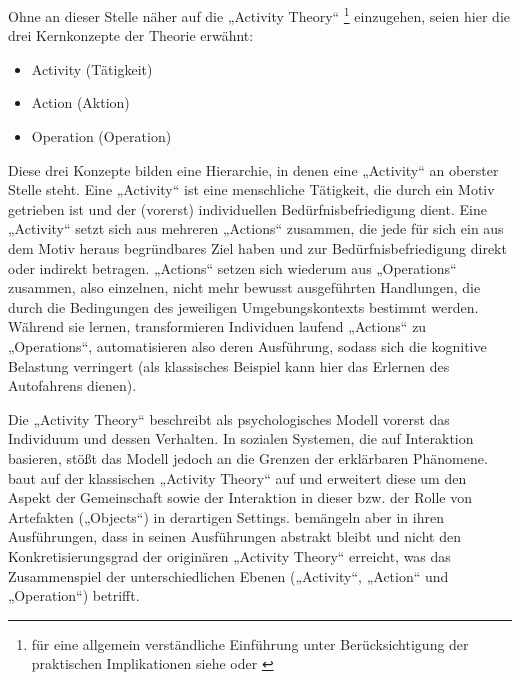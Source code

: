 Ohne an dieser Stelle näher auf die „Activity Theory“ \footnote{für eine allgemein verständliche Einführung unter Berücksichtigung der praktischen Implikationen siehe \citet{Dahme97} oder \citet{Nardi06}} einzugehen, seien hier die drei Kernkonzepte der Theorie erwähnt:
\begin{itemize}
	\item Activity (Tätigkeit)
	\item Action (Aktion)
	\item Operation (Operation)
\end{itemize}

Diese drei Konzepte bilden eine Hierarchie, in denen eine „Activity“ an oberster Stelle steht. Eine „Activity“ ist eine menschliche Tätigkeit, die durch ein Motiv getrieben ist und der (vorerst) individuellen Bedürfnisbefriedigung dient. Eine „Activity“ setzt sich aus mehreren „Actions“ zusammen, die jede für sich ein aus dem Motiv heraus begründbares Ziel haben und zur Bedürfnisbefriedigung direkt oder indirekt betragen. „Actions“ setzen sich wiederum aus „Operations“ zusammen, also einzelnen, nicht mehr bewusst ausgeführten Handlungen, die durch die Bedingungen des jeweiligen Umgebungskontexts bestimmt werden. Während sie lernen, transformieren Individuen laufend „Actions“ zu „Operations“, automatisieren also deren Ausführung, sodass sich die kognitive Belastung verringert (als klassisches Beispiel kann hier das Erlernen des Autofahrens dienen).

Die „Activity Theory“ beschreibt als psychologisches Modell vorerst das Individuum und dessen Verhalten. In sozialen Systemen, die auf Interaktion basieren, stößt das Modell jedoch an die Grenzen der erklärbaren Phänomene. \citet{Engestrom87} baut auf der klassischen „Activity Theory“ auf und erweitert diese um den Aspekt der Gemeinschaft sowie der Interaktion in dieser bzw. der Rolle von Artefakten („Objects“) in derartigen Settings. \citet{Fjuk97} bemängeln aber in ihren Ausführungen, dass \citeauthor{Engestrom87} in seinen Ausführungen abstrakt bleibt und nicht den Konkretisierungsgrad der originären „Activity Theory“ erreicht, was das Zusammenspiel der unterschiedlichen Ebenen („Activity“, „Action“ und „Operation“) betrifft.

